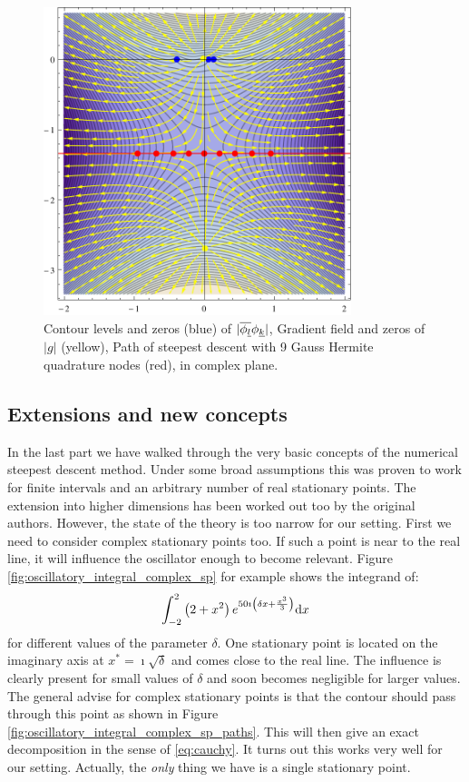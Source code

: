 \documentclass[a4paper,10pt]{article}
\begin{document}
\begin{figure}[h!]
  \centering
  \includegraphics[width=0.8\textwidth]{./fig/stationary_point_example.pdf}
  \caption{Contour levels and zeros (blue) of $|\overline{\phi_{\underline{l}}} \phi_{\underline{k}}|$,
  Gradient field and zeros of $|g|$ (yellow), Path of steepest descent with 9 Gauss Hermite
  quadrature nodes (red), in complex plane.}
  \label{fig:hawp_trafo_example}
\end{figure}


\subsection{Extensions and new concepts}


In the last part we have walked through the very basic concepts of the numerical steepest
descent method. Under some broad assumptions this was proven to work for finite intervals
and an arbitrary number of real stationary points. The extension into higher dimensions
has been worked out too by the original authors. However, the state of the theory is too narrow
for our setting. First we need to consider complex stationary points too. If such a point
is near to the real line, it will influence the oscillator enough to become relevant.
Figure \ref{fig:oscillatory_integral_complex_sp} for example shows the integrand of:
\begin{equation} \label{eq:nsd_csp_integral_example}
  \int_{-2}^{2} \left(2+x^2\right) e^{50 \imath \left(\delta x + \frac{x^3}{3}\right)} \mathrm{d}x
\end{equation}
for different values of the parameter $\delta$. One stationary point is located on the imaginary axis
at $x^{*} = \imath \sqrt{\delta}$ and comes close to the real line. The influence is clearly present
for small values of $\delta$ and soon becomes negligible for larger values.
The general advise for complex stationary points is that the contour should pass through this point
as shown in Figure \ref{fig:oscillatory_integral_complex_sp_paths}. This will then give an exact
decomposition in the sense of \eqref{eq:cauchy}. It turns out this works very well for our setting.
Actually, the \emph{only} thing we have is a single stationary point.
\end{document}
